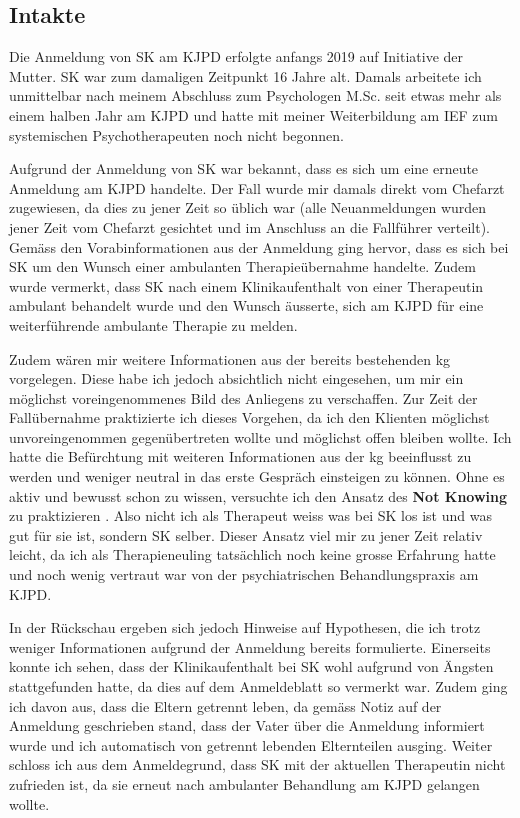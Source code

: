 \subsection{Intakte} 
Die Anmeldung von SK am KJPD erfolgte anfangs 2019 auf Initiative der Mutter. SK war zum damaligen Zeitpunkt 16 Jahre alt. Damals arbeitete ich unmittelbar nach meinem Abschluss zum Psychologen M.Sc. seit etwas mehr als einem halben Jahr am KJPD und hatte mit meiner Weiterbildung am IEF zum systemischen Psychotherapeuten noch nicht begonnen. 

Aufgrund der Anmeldung von SK war bekannt, dass es sich um eine erneute Anmeldung am KJPD handelte. Der Fall wurde mir damals direkt vom Chefarzt zugewiesen, da dies zu jener Zeit so üblich war (alle Neuanmeldungen wurden jener Zeit vom Chefarzt gesichtet und im Anschluss an die Fallführer verteilt). Gemäss den Vorabinformationen aus der Anmeldung ging hervor, dass es sich bei SK um den Wunsch einer ambulanten Therapieübernahme handelte. Zudem wurde vermerkt, dass SK nach einem Klinikaufenthalt von einer Therapeutin ambulant behandelt wurde und den Wunsch äusserte, sich am KJPD für eine weiterführende ambulante Therapie zu melden.

Zudem wären mir weitere Informationen aus der bereits bestehenden \ac{kg} vorgelegen. Diese habe ich jedoch absichtlich nicht eingesehen, um mir ein möglichst voreingenommenes Bild des Anliegens zu verschaffen. Zur Zeit der Fallübernahme praktizierte ich dieses Vorgehen, da ich den Klienten möglichst unvoreingenommen gegenübertreten wollte und möglichst offen bleiben wollte. Ich hatte die Befürchtung mit weiteren Informationen aus der \ac{kg} beeinflusst zu werden und weniger neutral in das erste Gespräch einsteigen zu können. Ohne es aktiv und bewusst schon zu wissen, versuchte ich den Ansatz des \textbf{Not Knowing} zu praktizieren \cite{Anderson1992}. Also nicht ich als Therapeut weiss was bei SK los ist und was gut für sie ist, sondern SK selber. Dieser Ansatz viel mir zu jener Zeit relativ leicht, da ich als Therapieneuling tatsächlich noch keine grosse Erfahrung hatte und noch wenig vertraut war von der psychiatrischen Behandlungspraxis am KJPD. 

In der Rückschau ergeben sich jedoch Hinweise auf Hypothesen, die ich trotz weniger Informationen aufgrund der Anmeldung bereits formulierte. Einerseits konnte ich sehen, dass der Klinikaufenthalt bei SK wohl aufgrund von Ängsten stattgefunden hatte, da dies auf dem Anmeldeblatt so vermerkt war. Zudem ging ich davon aus, dass die Eltern getrennt leben, da gemäss Notiz auf der Anmeldung geschrieben stand, dass der Vater über die Anmeldung informiert wurde und ich automatisch von getrennt lebenden Elternteilen ausging. Weiter schloss ich aus dem Anmeldegrund, dass SK mit der aktuellen Therapeutin nicht zufrieden ist, da sie erneut nach ambulanter Behandlung am KJPD gelangen wollte. 


